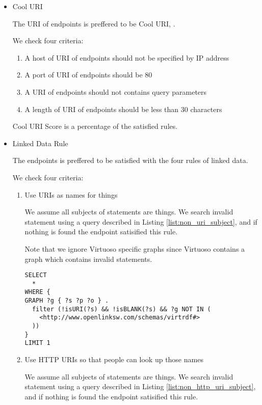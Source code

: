 \documentclass[11pt,a4paper]{article}
\begin{document}
  \begin{itemize}

    \item Cool URI

    The URI of endpoints is preffered to be Cool URI\cite{Leo:08:CoolUri}, \cite{Leigh:12:LinkedDataPatterns}.

    We check four criteria:
    \begin{enumerate}
      \item A host of URI of endpoints should not be specified by IP address
      \item A port of URI of endpoints should be 80
      \item A URI of endpoints should not contains query parameters
      \item A length of URI of endpoints should be less than 30 characters
    \end{enumerate}

    Cool URI Score is a percentage of the satisfied rules.

    \item Linked Data Rule

    The endpoints is preffered to be satisfied with the four rules of linked data\cite{Tim:06:LinkedDataRules}.

    We check four criteria:
    \begin{enumerate}
      \item Use URIs as names for things

      We assume all subjects of statements are things. We search invalid statement using a query described in Listing \ref{list:non_uri_subject}, and if nothing is found the endpoint satisified this rule.

      Note that we ignore Virtuoso specific graphs since Virtuoso contains a graph which contains invalid statements.

      \begin{lstlisting}[basicstyle=\ttfamily\footnotesize,breaklines=true,frame=single,caption=A Query for searching non-URI subjects,label=list:non_uri_subject]
SELECT
  *
WHERE {
GRAPH ?g { ?s ?p ?o } .
  filter (!isURI(?s) && !isBLANK(?s) && ?g NOT IN (
    <http://www.openlinksw.com/schemas/virtrdf#>
  ))
}
LIMIT 1
      \end{lstlisting}

      \item Use HTTP URIs so that people can look up those names

      We assume all subjects of statements are things. We search invalid statement using a query described in Listing \ref{list:non_http_uri_subject}, and if nothing is found the endpoint satisified this rule.


\end{enumerate}
\end{itemize}
\end{document}
